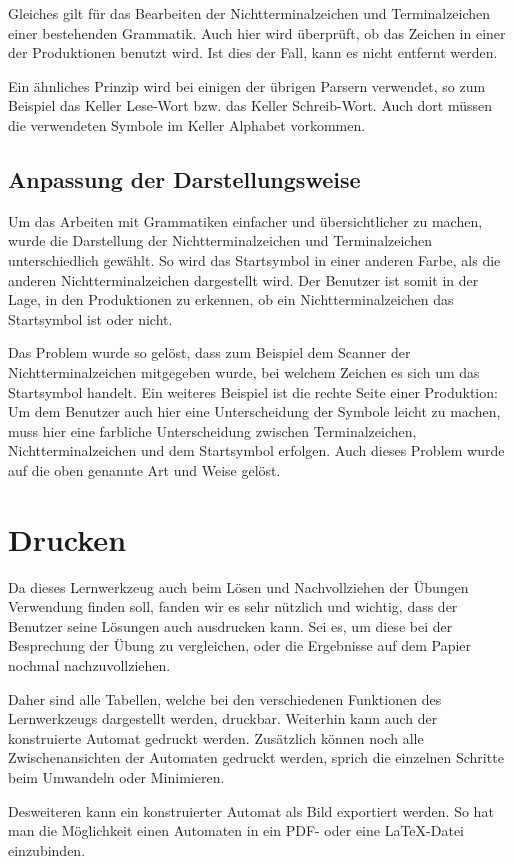 Gleiches gilt für das Bearbeiten der Nichtterminalzeichen und Terminalzeichen
einer bestehenden Grammatik. Auch hier wird überprüft, ob das Zeichen in einer
der Produktionen benutzt wird. Ist dies der Fall, kann es nicht entfernt
werden.\vspace{10pt}

Ein ähnliches Prinzip wird bei einigen der übrigen Parsern verwendet, so zum
Beispiel das Keller Lese-Wort bzw. das Keller Schreib-Wort. Auch dort müssen
die verwendeten Symbole im Keller Alphabet vorkommen.\vspace{10pt}


\subsection{Anpassung der Darstellungsweise}\label{ParserAdaption}

Um das Arbeiten mit Grammatiken einfacher und übersichtlicher zu
machen, wurde die Darstellung der Nichtterminalzeichen und
Terminalzeichen unterschiedlich gewählt. So wird das Startsymbol in einer
anderen Farbe, als die anderen Nichtterminalzeichen dargestellt wird. Der
Benutzer ist somit in der Lage, in den Produktionen zu erkennen, ob ein
Nichtterminalzeichen das Startsymbol ist oder nicht.\vspace{10pt}

Das Problem wurde so gelöst, dass zum Beispiel dem Scanner der
Nichtterminalzeichen mitgegeben wurde, bei welchem Zeichen es sich um das
Startsymbol handelt. Ein weiteres Beispiel ist die rechte Seite einer
Produktion: Um dem Benutzer auch hier eine Unterscheidung der Symbole leicht zu
machen, muss hier eine farbliche Unterscheidung zwischen Terminalzeichen,
Nichtterminalzeichen und dem Startsymbol erfolgen. Auch dieses Problem wurde auf
die oben genannte Art und Weise gelöst.\vspace{10pt}


\section{Drucken}\label{Print}

Da dieses Lernwerkzeug auch beim Lösen und Nachvollziehen der Übungen
Verwendung finden soll, fanden wir es sehr nützlich und wichtig, dass der
Benutzer seine Lösungen auch ausdrucken kann. Sei es, um diese bei der
Besprechung der Übung zu vergleichen, oder die Ergebnisse auf dem Papier
nochmal nachzuvollziehen.\vspace{10pt}

Daher sind alle Tabellen, welche bei den verschiedenen Funktionen des
Lernwerkzeugs dargestellt werden, druckbar. Weiterhin kann auch der konstruierte
Automat gedruckt werden. Zusätzlich können noch alle Zwischenansichten der
Automaten gedruckt werden, sprich die einzelnen Schritte beim Umwandeln oder
Minimieren.\vspace{10pt}

Desweiteren kann ein konstruierter Automat als Bild exportiert werden. So hat
man die Möglichkeit einen Automaten in ein PDF- oder eine \LaTeX -Datei
einzubinden.\vspace{10pt}


